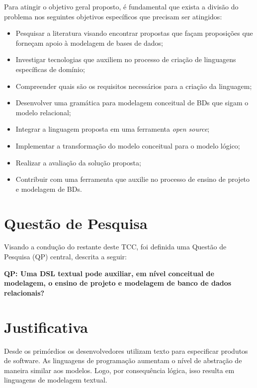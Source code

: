 Para atingir o objetivo geral proposto, é fundamental que exista a divisão do problema nos seguintes objetivos específicos que precisam ser atingidos:

\begin{itemize} 
    \item Pesquisar a literatura visando encontrar propostas que façam proposições que forneçam apoio à modelagem de bases de dados; 
    \item Investigar tecnologias que auxiliem no processo de criação de linguagens específicas de domínio;
    \item Compreender quais são os requisitos necessários para a criação da linguagem;
    \item Desenvolver uma gramática para modelagem conceitual de \acp{BD} que sigam o modelo relacional;
    \item Integrar a linguagem proposta em uma ferramenta \textit{open source};
    \item Implementar a transformação do modelo conceitual para o modelo lógico;
    \item Realizar a avaliação da solução proposta;
    \item Contribuir com uma ferramenta que auxilie no processo de ensino de projeto e modelagem de \acp{BD}.
\end{itemize}

\section{Questão de Pesquisa}

Visando a condução do restante deste \ac{TCC}, foi definida uma Questão de Pesquisa (QP) central, descrita a seguir:

\textbf{QP: Uma \ac{DSL} textual pode auxiliar, em nível conceitual de modelagem, o ensino de projeto e modelagem de banco de dados relacionais?}

\section{Justificativa}

Desde os primórdios os desenvolvedores utilizam texto para especificar produtos de software. 
As linguagens de programação aumentam o nível de abstração de maneira similar aos modelos. 
Logo, por consequência lógica, isso resulta em linguagens de modelagem textual.

